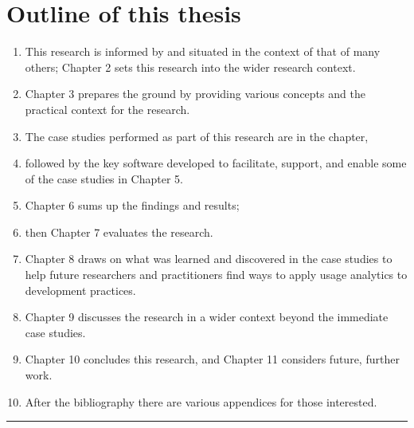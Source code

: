 \section{Outline of this thesis}
\begin{enumerate}
    \item This research is informed by and situated in the context of that of many others; Chapter 2 sets this research into the wider research context.
    \item Chapter 3 prepares the ground by providing various concepts and the practical context for the research.
    \item The case studies performed as part of this research are in the  chapter,
    \item followed by the key software developed to facilitate, support, and enable some of the case studies in Chapter 5.
    \item Chapter 6 sums up the findings and results;
    \item then Chapter 7 evaluates the research.
    \item Chapter 8 draws on what was learned and discovered in the case studies to help future researchers and practitioners find ways to apply usage analytics to development practices.
    \item Chapter 9 discusses the research in a wider context beyond the immediate case studies.
    \item Chapter 10 concludes this research, and Chapter 11 considers future, further work.
    \item After the bibliography there are various appendices for those interested.
\end{enumerate}


\clearpage
\par\noindent\rule{\textwidth}{0.4pt}
